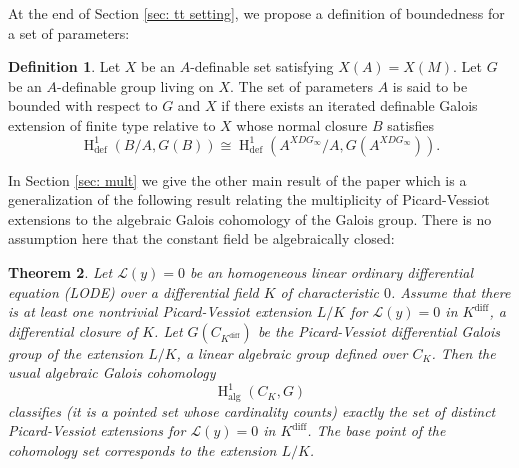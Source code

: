 \documentclass{amsart}
\newtheorem{theorem}{Theorem}[section]
\theoremstyle{definition}
\newtheorem{definition}[theorem]{Definition}
\theoremstyle{remark}
\numberwithin{equation}{section}
\def \defin {\operatorname{def}}
\def \HH {\operatorname{H}}
\def \diff {\operatorname{diff}}
\def \alg {\operatorname{alg}}
\begin{document}
At the end of Section \ref{sec: tt setting}, we propose a definition of boundedness for a set of parameters:

\begin{definition}
    Let $X$ be an $A$-definable set satisfying $X(A)= X(M)$. Let $G$ be an $A$-definable group living on $X$.  The set of parameters $A$ is said to be bounded with respect to $G$ and $X$ if there exists an iterated definable Galois extension of finite type relative to $X$ whose normal closure $B$ satisfies $$\HH^{1}_{\defin}(B/A, G(B)) \cong \HH^{1}_{\defin}(A^{XDG_\infty}/A, G(A^{XDG_\infty})).$$
\end{definition}

In Section \ref{sec: mult} we give the other main result of the paper which is a generalization of the following result relating the multiplicity of Picard-Vessiot extensions to the algebraic Galois cohomology of the Galois group. There is no assumption here that the constant field be algebraically closed:

\begin{theorem}\label{fact: counting PV}\cite{KamenskyPillay}\cite{DeligneMilne2022} Let $\mathcal{L}(y)=0$ be an  homogeneous linear ordinary differential equation (LODE) over a differential field $K$ of characteristic $0$. Assume that there is at least one nontrivial Picard-Vessiot extension $L/K$ for $\mathcal{L}(y)=0$ in $K^{\diff}$, a differential closure of $K$. Let $G(C_{K^{\diff}})$ be the Picard-Vessiot differential Galois group of the extension $L/K$, a linear algebraic group defined over $C_K$. Then the usual algebraic Galois cohomology $$\HH^1_{\alg}(C_K,G)$$
classifies (it is a pointed set whose cardinality counts) exactly the set of distinct Picard-Vessiot extensions for $\mathcal{L}(y)=0$ in $K^{\diff}$. The base point of the cohomology set corresponds to the extension $L/K$.
\end{theorem}



\end{document}
